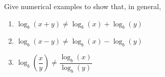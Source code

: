 {Give numerical examples to show that, in general,

\begin{enumerate}

\item $\log_{b}(x + y) \neq \log_{b}(x) + \log_{b}(y)$
\item $\log_{b}(x - y) \neq \log_{b}(x) - \log_{b}(y)$
\item $\log_{b}\left(\dfrac{x}{y}\right) \neq \dfrac{\log_{b}(x)}{\log_{b}(y)}$

\end{enumerate}}
